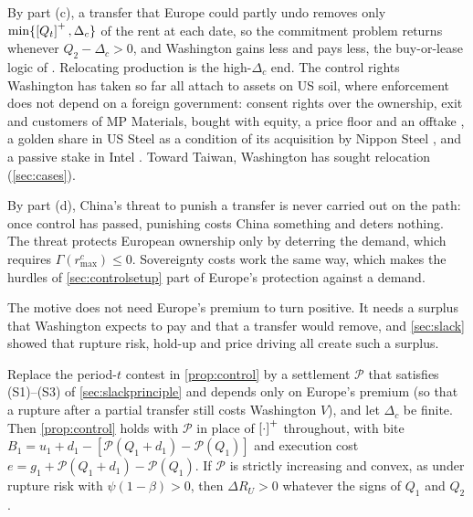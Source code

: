 By part (c), a transfer that Europe could partly undo removes only $\min\{\left[Q_t\right]^{+},\Delta_c\}$ of the rent at each date, so the commitment problem returns whenever $Q_2-\Delta_c>0$, and Washington gains less and pays less, the buy-or-lease logic of \citet{harstad2016market}. Relocating production is the high-$\Delta_c$ end. The control rights Washington has taken so far all attach to assets on US soil, where enforcement does not depend on a foreign government: consent rights over the ownership, exit and customers of MP Materials, bought with equity, a price floor and an offtake \citep{mp2025dod}, a golden share in US Steel as a condition of its acquisition by Nippon Steel \citep{ussteel2025nsa}, and a passive stake in Intel \citep{intel2025agreement}. Toward Taiwan, Washington has sought relocation (\cref{sec:cases}).

By part (d), China's threat to punish a transfer is never carried out on the path: once control has passed, punishing costs China something and deters nothing. The threat protects European ownership only by deterring the demand, which requires $\Gamma(r^c_{\max})\le 0$. Sovereignty costs work the same way, which makes the hurdles of \cref{sec:controlsetup} part of Europe's protection against a demand.

The motive does not need Europe's premium to turn positive. It needs a surplus that Washington expects to pay and that a transfer would remove, and \cref{sec:slack} showed that rupture risk, hold-up and price driving all create such a surplus.

\begin{remark}\label{rem:controlsettle}
Replace the period-$t$ contest in \cref{prop:control} by a settlement $\mathcal P$ that satisfies (S1)--(S3) of \cref{sec:slackprinciple} and depends only on Europe's premium (so that a rupture after a partial transfer still costs Washington $V$), and let $\Delta_c$ be finite. Then \cref{prop:control} holds with $\mathcal P$ in place of $\left[\cdot\right]^{+}$ throughout, with bite $B_1=u_1+d_1-[\mathcal P(Q_1+d_1)-\mathcal P(Q_1)]$ and execution cost $e=g_1+\mathcal P(Q_1+d_1)-\mathcal P(Q_1)$. If $\mathcal P$ is strictly increasing and convex, as under rupture risk with $\psi(1-\beta)>0$, then $\Delta R_U>0$ whatever the signs of $Q_1$ and $Q_2$.
\end{remark}

